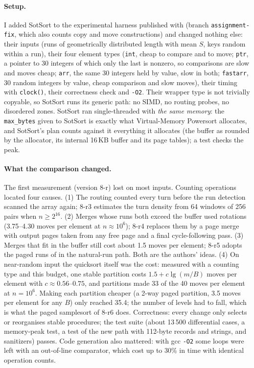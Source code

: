 \documentclass[10pt,a4paper]{article}
\begin{document}
\paragraph{Setup.} I added SotSort to the experimental harness published with
\cite{vmpowersort} (branch \texttt{assignment-fix}, which also counts copy and move
constructions) and changed nothing else: their inputs (runs of geometrically distributed
length with mean $S$, keys random within a run), their four element types (\texttt{int}, cheap
to compare and to move; \texttt{ptr}, a pointer to 30 integers of which only the last is
nonzero, so comparisons are slow and moves cheap; \texttt{arr}, the same 30 integers held by
value, slow in both; \texttt{fastarr}, 30 random integers by value, cheap comparison and slow
moves), their timing with \texttt{clock()}, their correctness check and \texttt{-O2}. Their
wrapper type is not trivially copyable, so SotSort runs its generic path: no SIMD, no routing
probes, no disordered zones. SotSort ran single-threaded with \emph{the same memory}: the
\texttt{max\_bytes} given to SotSort is exactly what Virtual-Memory Powersort allocates, and
SotSort's plan counts against it everything it allocates (the buffer as rounded by the
allocator, its internal 16\,KB buffer and its page tables); a test checks the peak.

\paragraph{What the comparison changed.} The first measurement (version 8-r) lost on most
inputs. Counting operations located four causes. (1) The routing counted every turn before the
run detection scanned the array again; 8-r3 estimates the turn density from 64 windows of 256
pairs when $n\ge 2^{16}$. (2) Merges whose runs both exceed the buffer used rotations (3.75--4.30
moves per element at $n\approx 10^6$); 8-r4 replaces them by a page merge with output pages taken
from any free page and a final cycle-following pass. (3) Merges that fit in the buffer still
cost about 1.5 moves per element; 8-r5 adopts the paged runs of \cite{vmpowersort} in the
natural-run path. Both are the authors' ideas. (4) On near-random input the quicksort itself
was the cost: measured with a counting type and this budget, one stable partition costs
$1.5+c\lg(m/B)$ moves per element with $c\approx0.56$--$0.75$, and partitions made 33 of the 40
moves per element at $n=10^6$. Making each partition cheaper (a 2-way paged partition, 3.5
moves per element for any $B$) only reached 35.4; the number of levels had to fall, which is what
the paged samplesort of 8-r6 does. Correctness: every change only selects or reorganises stable
procedures; the test suite (about 13\,500 differential cases, a memory-peak test, a test of the
new path with 112-byte records and strings, and sanitizers) passes. Code generation also
mattered: with gcc \texttt{-O2} some loops were left with an out-of-line comparator, which cost
up to 30\% in time with identical operation counts.
\end{document}
